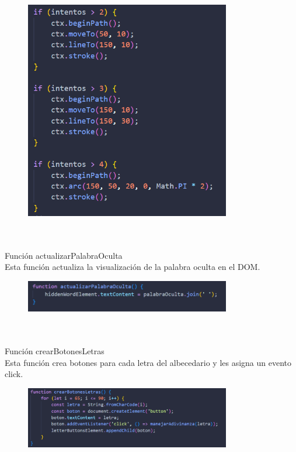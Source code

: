 \documentclass{article}
\begin{document}
\begin{figure}[H]
		          \centering
		          \includegraphics[width=0.8\textwidth,keepaspectratio]                       {img/horAh.png}
    \end{figure}  
\\
\\Función actualizarPalabraOculta
\\Esta función actualiza la visualización de la palabra oculta en el DOM.
\begin{figure}[H]
		          \centering
		          \includegraphics[width=0.8\textwidth,keepaspectratio]                       {img/actAh.png}
    \end{figure}  
\\
\\Función crearBotonesLetras
\\Esta función crea botones para cada letra del albecedario y les asigna un evento click.
\begin{figure}[H]
		          \centering
		          \includegraphics[width=0.8\textwidth,keepaspectratio]                       {img/creAh.png}
    \end{figure}  
\\
\end{document}
